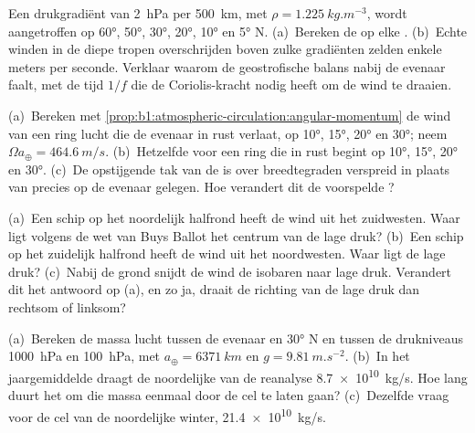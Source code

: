 \begin{exercise}[$\star\star$]\label{exo:b1:atmospheric-circulation:5}
Een drukgradiënt van \qty{2}{hPa} per \qty{500}{km}, met $\rho =
\qty{1.225}{kg.m^{-3}}$, wordt aangetroffen op \ang{60}, \ang{50}, \ang{30}, \ang{20},
\ang{10} en \ang{5} N. (a)~Bereken de  op elke .
(b)~Echte winden in de diepe tropen overschrijden boven zulke gradiënten zelden enkele meters per seconde. Verklaar waarom de geostrofische balans nabij de evenaar faalt, met de tijd $1/f$ die de Coriolis-kracht nodig heeft om de wind te draaien.
\end{exercise}

\begin{exercise}[$\star\star$]\label{exo:b1:atmospheric-circulation:6}
(a)~Bereken met \cref{prop:b1:atmospheric-circulation:angular-momentum} de wind
van een ring lucht die de evenaar in rust verlaat, op \ang{10}, \ang{15}, \ang{20} en
\ang{30}; neem $\Omega a_\oplus = \qty{464.6}{m/s}$. (b)~Hetzelfde voor een ring die
in rust begint op \ang{10}, \ang{15}, \ang{20} en \ang{30}. (c)~De opstijgende tak
van de  is over breedtegraden verspreid in plaats van precies op de evenaar gelegen.
Hoe verandert dit de voorspelde ?
\end{exercise}

\begin{exercise}[$\star\star$]\label{exo:b1:atmospheric-circulation:7}
(a)~Een schip op het noordelijk halfrond heeft de wind uit het zuidwesten. Waar ligt volgens de wet van Buys Ballot het centrum van de lage druk? (b)~Een schip op het zuidelijk halfrond heeft de wind uit het noordwesten. Waar ligt de lage druk? (c)~Nabij de grond snijdt de wind de isobaren naar lage druk. Verandert dit het antwoord op (a), en zo ja, draait de richting van de lage druk dan rechtsom of linksom?
\end{exercise}

\begin{exercise}[$\star\star$]\label{exo:b1:atmospheric-circulation:8}
(a)~Bereken de massa lucht tussen de evenaar en \ang{30} N en tussen de drukniveaus
\qty{1000}{hPa} en \qty{100}{hPa}, met $a_\oplus = \qty{6371}{km}$
en $g = \qty{9.81}{m.s^{-2}}$. (b)~In het jaargemiddelde draagt de noordelijke
 van de reanalyse \qty{8.7e10}{kg/s}. Hoe lang duurt het om die massa eenmaal door de cel te laten gaan? (c)~Dezelfde vraag voor de cel van de noordelijke winter, \qty{21.4e10}{kg/s}.
\end{exercise}

